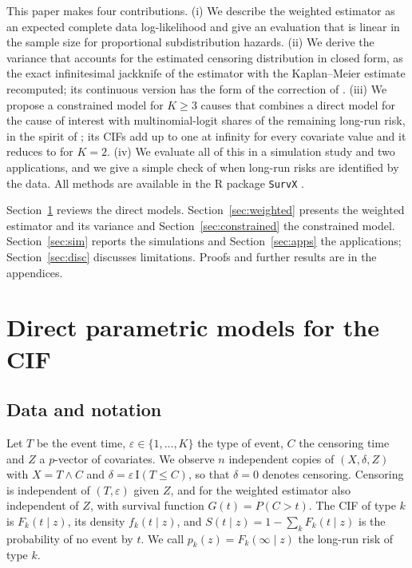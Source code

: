 \documentclass[11pt]{article}
\newcommand{\I}{\mathrm{I}}
\begin{document}
This paper makes four contributions. (i) We describe the weighted estimator as an expected complete
data log-likelihood and give an evaluation that is linear in the sample size for proportional
subdistribution hazards. (ii) We derive the variance that accounts for the estimated censoring
distribution in closed form, as the exact infinitesimal jackknife of the estimator with the
Kaplan--Meier estimate recomputed; its continuous version has the form of the correction of
\citet{fine1999}. (iii) We propose a constrained model for $K \ge 3$ causes that combines a direct
model for the cause of interest with multinomial-logit shares of the remaining long-run risk, in
the spirit of \citet{larson1985}; its CIFs add up to one at infinity for every covariate value and
it reduces to \citet{shi2013} for $K = 2$. (iv) We evaluate all of this in a simulation study and
two applications, and we give a simple check of when long-run risks are identified by the data.
All methods are available in the R package \texttt{SurvX} \citep{ezzatabadipour2026}.

Section~\ref{sec:models} reviews the direct models. Section~\ref{sec:weighted} presents the
weighted estimator and its variance and Section~\ref{sec:constrained} the constrained model.
Section~\ref{sec:sim} reports the simulations and Section~\ref{sec:apps} the applications;
Section~\ref{sec:disc} discusses limitations. Proofs and further results are in the appendices.

\section{Direct parametric models for the CIF}\label{sec:models}
\subsection{Data and notation}
Let $T$ be the event time, $\varepsilon \in \{1, \dots, K\}$ the type of event, $C$ the censoring
time and $Z$ a $p$-vector of covariates. We observe $n$ independent copies of
$(X, \delta, Z)$ with $X = T \wedge C$ and $\delta = \varepsilon\,\I(T \le C)$, so that
$\delta = 0$ denotes censoring. Censoring is independent of $(T, \varepsilon)$ given $Z$, and
for the weighted estimator also independent of $Z$, with survival function $G(t) = P(C > t)$.
The CIF of type $k$ is $F_k(t \mid z)$, its density $f_k(t \mid z)$, and
$S(t \mid z) = 1 - \sum_k F_k(t \mid z)$ is the probability of no event by $t$. We call
$p_k(z) = F_k(\infty \mid z)$ the long-run risk of type $k$.
\end{document}
